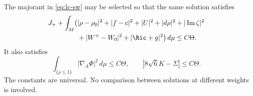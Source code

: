 \begin{lemma}\label{lem:lc-retained}
The majorant in \eqref{eq:lc-sw} may be selected so that the same solution
satisfies
\begin{equation}\label{eq:lc-retained}
\begin{split}
 J_++\int_M\bigl(&|\rho-\rho_0|^2+|f-c|^2+|U|^2+|d\rho|^2
       +|\operatorname{Im}\zeta|^2\\
       &+|W^+-W_0|^2+|\Ric+g|^2\bigr)\,d\mu\le C\Theta.
\end{split}
\end{equation}
It also satisfies
\begin{equation}\label{eq:lc-low-and-slack}
 \int_{\{\rho\le1\}}|\nabla_A\Phi|^2\,d\mu\le C\Theta,
 \qquad |8\sqrt6K-\Sigma|\le C\Theta.
\end{equation}
The constants are universal.  No comparison between solutions at
different weights is involved.
\end{lemma}

